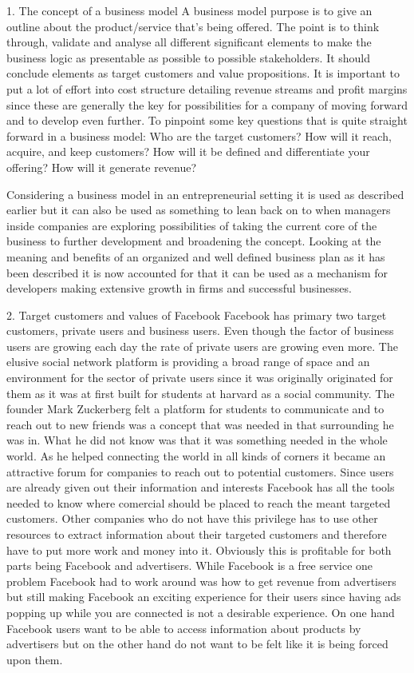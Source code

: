 \documentclass[conference]{IEEEtran}
\begin{document}
1. The concept of a business model
A business model purpose is to give an outline about the product/service that's
being offered. The point is to think through, validate and analyse all
different significant elements to make the business logic as presentable as
possible to possible stakeholders. It should conclude elements as target
customers and value propositions. It is important to put a lot of effort into
cost structure detailing revenue streams and profit margins since these are
generally the key for possibilities for a company of moving forward and to
develop even further. 
To pinpoint some key questions that is quite straight forward in a business model:
Who are the target customers?
How will it reach, acquire, and keep customers?
How will it be defined and differentiate your offering?
How will it generate revenue?

Considering a business model in an entrepreneurial setting it is used as
described earlier but it can also be used as something to lean back on to when
managers inside companies are exploring possibilities of taking the current
core of the business to further development and broadening the concept. Looking
at the meaning and benefits of an organized and well defined business plan as
it has been described it is now accounted for that it can be used as a
mechanism for developers making extensive growth in firms and successful
businesses.  

2. Target customers and values of Facebook
Facebook has primary two target customers, private users and business users.
Even though the factor of business users are growing each day the rate of
private users are growing even more. The elusive social network platform is
providing a broad range of space and an environment for the sector of private
users since it was originally originated for them as it was at first built for
students at harvard as a social community. The founder Mark Zuckerberg felt a
platform for students to communicate and to reach out to new friends was a
concept that was needed in that surrounding he was in. What he did not know was
that it was something needed in the whole world. As he helped connecting the
world in all kinds of corners it became an attractive forum for companies to
reach out to potential customers. Since users are already given out their
information and interests Facebook has all the tools needed to know where
comercial should be placed to reach the meant targeted customers. Other
companies who do not have this privilege has to use other resources to extract
information about their targeted customers and therefore have to put more work
and money into it. Obviously this is profitable for both parts being Facebook
and advertisers. While Facebook is a free service one problem Facebook had to
work around was how to get revenue from advertisers but still making Facebook
an exciting experience for their users since having ads popping up while you
are connected is not a desirable experience. On one hand Facebook users want to
be able to access information about products by advertisers but on the other
hand do not want to be felt like it is being forced upon them. 
\end{document}
